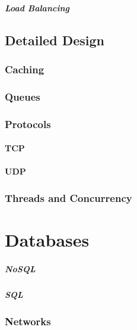 \documentclass[a4paper, 11pt]{book}
\begin{document}
    \paragraph{Load Balancing}


    \section{Detailed Design}

    \subsection{Caching}

    \subsection{Queues}

    \subsection{Protocols}

    \subsubsection{TCP}

    \subsubsection{UDP}

    \subsection{Threads and Concurrency}


    \chapter{Databases}

    \paragraph{NoSQL}

    \paragraph{SQL}

    \subsection{Networks}
\end{document}
